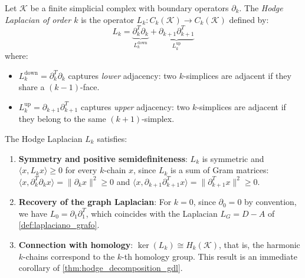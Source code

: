 \begin{definition}\label{def:hodge_laplacian_gdl}
	Let $\mathcal{K}$ be a finite simplicial complex with boundary operators $\partial_k$. The \textit{Hodge Laplacian of order $k$} is the operator $L_k: C_k(\mathcal{K}) \to C_k(\mathcal{K})$ defined by:
	\[
		L_k = \underbrace{\partial_k^T \partial_k}_{L_k^{\mathrm{down}}} + \underbrace{\partial_{k+1} \partial_{k+1}^T}_{L_k^{\mathrm{up}}}
	\]
	where:
	\begin{itemize}
		\item $L_k^{\mathrm{down}} = \partial_k^T \partial_k$ captures \textit{lower} adjacency: two $k$-simplices are adjacent if they share a $(k{-}1)$-face.
		\item $L_k^{\mathrm{up}} = \partial_{k+1} \partial_{k+1}^T$ captures \textit{upper} adjacency: two $k$-simplices are adjacent if they belong to the same $(k{+}1)$-simplex.
	\end{itemize}
\end{definition}

\begin{proposition}\label{prop:propiedades_hodge_gdl}
	The Hodge Laplacian $L_k$ satisfies:
	\begin{enumerate}
		\item \textbf{Symmetry and positive semidefiniteness}: $L_k$ is symmetric and $\langle x, L_k x \rangle \geq 0$ for every $k$-chain $x$, since $L_k$ is a sum of Gram matrices: $\langle x, \partial_k^T \partial_k x \rangle = \|\partial_k x\|^2 \geq 0$ and $\langle x, \partial_{k+1} \partial_{k+1}^T x \rangle = \|\partial_{k+1}^T x\|^2 \geq 0$.
		\item \textbf{Recovery of the graph Laplacian}: For $k = 0$, since $\partial_0 = 0$ by convention, we have $L_0 = \partial_1 \partial_1^T$, which coincides with the Laplacian $L_G = D - A$ of \autoref{def:laplaciano_grafo}.
		\item \textbf{Connection with homology}: $\ker(L_k) \cong H_k(\mathcal{K})$, that is, the harmonic $k$-chains correspond to the $k$-th homology group. This result is an immediate corollary of \autoref{thm:hodge_decomposition_gdl}.
	\end{enumerate}
\end{proposition}

